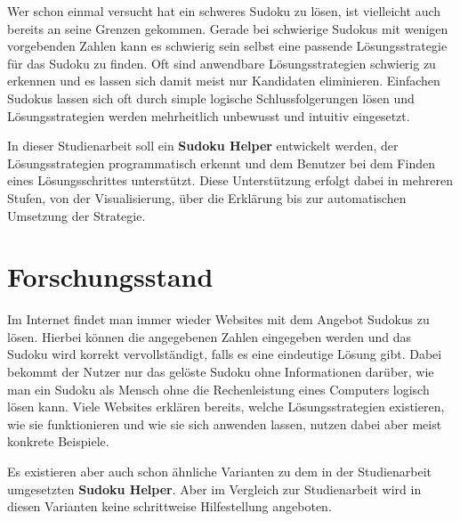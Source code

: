 Wer schon einmal versucht hat ein schweres Sudoku  zu lösen, ist vielleicht auch bereits an seine Grenzen gekommen. Gerade bei schwierige Sudokus mit wenigen vorgebenden Zahlen kann es schwierig sein selbst eine passende Lösungsstrategie für das Sudoku zu finden. Oft sind anwendbare Lösungsstrategien schwierig zu erkennen und es lassen sich damit meist nur Kandidaten eliminieren. Einfachen Sudokus lassen sich oft durch simple logische Schlussfolgerungen lösen und Lösungsstrategien werden mehrheitlich unbewusst und intuitiv eingesetzt. \cite{martin}

In dieser Studienarbeit soll ein \textbf{Sudoku Helper} entwickelt werden, der Lösungsstrategien programmatisch erkennt und dem Benutzer bei dem Finden eines Lösungsschrittes unterstützt. Diese Unterstützung erfolgt dabei in mehreren Stufen, von der Visualisierung, über die Erklärung bis zur automatischen Umsetzung der Strategie.


\section{Forschungsstand}
Im Internet findet man immer wieder Websites mit dem Angebot Sudokus zu lösen. Hierbei können die angegebenen Zahlen eingegeben werden und das Sudoku wird korrekt vervollständigt, falls es eine eindeutige Lösung gibt. Dabei bekommt der Nutzer nur das gelöste Sudoku ohne Informationen darüber, wie man ein Sudoku als Mensch ohne die Rechenleistung eines Computers logisch lösen kann. Viele Websites erklären bereits, welche Lösungsstrategien existieren, wie sie funktionieren und wie sie sich anwenden lassen, nutzen dabei aber meist konkrete Beispiele.

Es existieren aber auch schon ähnliche Varianten zu dem in der Studienarbeit umgesetzten \textbf{Sudoku Helper}.
Aber im Vergleich zur Studienarbeit wird in diesen Varianten keine schrittweise Hilfestellung angeboten.




